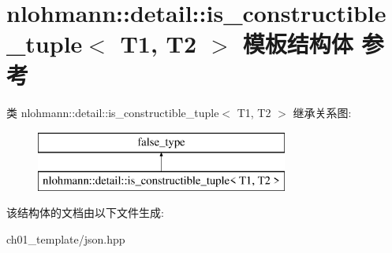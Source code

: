 \hypertarget{structnlohmann_1_1detail_1_1is__constructible__tuple}{}\section{nlohmann\+::detail\+::is\+\_\+constructible\+\_\+tuple$<$ T1, T2 $>$ 模板结构体 参考}
\label{structnlohmann_1_1detail_1_1is__constructible__tuple}
类 nlohmann\+::detail\+::is\+\_\+constructible\+\_\+tuple$<$ T1, T2 $>$ 继承关系图\+:\begin{figure}[H]
\begin{center}
\leavevmode
\includegraphics[height=2.000000cm]{structnlohmann_1_1detail_1_1is__constructible__tuple}
\end{center}
\end{figure}


该结构体的文档由以下文件生成\+:\begin{DoxyCompactItemize}
\item 
ch01\+\_\+template/json.\+hpp\end{DoxyCompactItemize}
